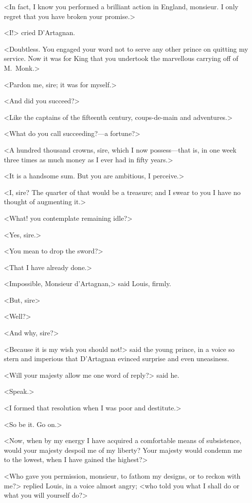 <In fact, I know you performed a brilliant action in England, monsieur. I only regret that you have broken your promise.>

<I\@!> cried D'Artagnan.

<Doubtless. You engaged your word not to serve any other prince on quitting my service. Now it was for King  that you undertook the marvellous carrying off of M.~Monk.>

<Pardon me, sire; it was for myself.>

<And did you succeed?>

<Like the captains of the fifteenth century, coups-de-main and adventures.>

<What do you call succeeding?—a fortune?>

<A hundred thousand crowns, sire, which I now possess—that is, in one week three times as much money as I ever had in fifty years.>

<It is a handsome sum. But you are ambitious, I perceive.>

<I, sire? The quarter of that would be a treasure; and I swear to you I have no thought of augmenting it.>

<What! you contemplate remaining idle?>

<Yes, sire.>

<You mean to drop the sword?>

<That I have already done.>

<Impossible, Monsieur d'Artagnan,> said Louis, firmly.

<But, sire\longdash>

<Well?>

<And why, sire?>

<Because it is my wish you should not!> said the young prince, in a voice so stern and imperious that D'Artagnan evinced surprise and even uneasiness.

<Will your majesty allow me one word of reply?> said he.

<Speak.>

<I formed that resolution when I was poor and destitute.>

<So be it. Go on.>

<Now, when by my energy I have acquired a comfortable means of subsistence, would your majesty despoil me of my liberty? Your majesty would condemn me to the lowest, when I have gained the highest?>

<Who gave you permission, monsieur, to fathom my designs, or to reckon with me?> replied Louis, in a voice almost angry; <who told you what I shall do or what you will yourself do?>


